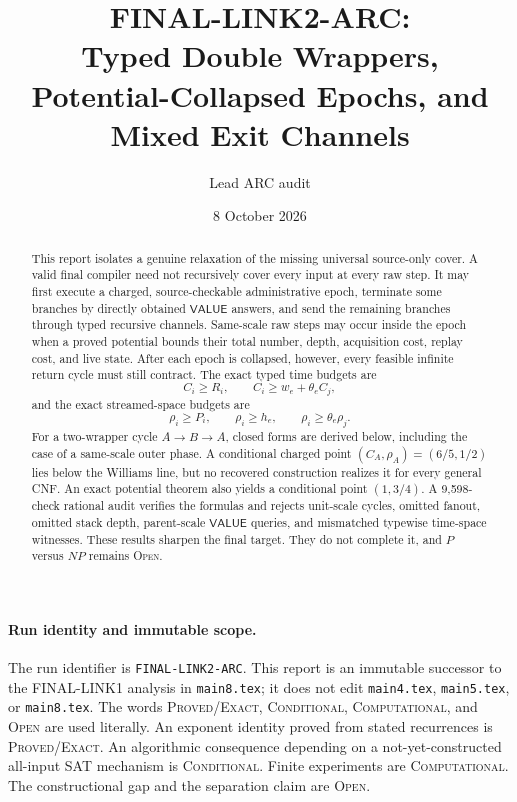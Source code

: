 \documentclass[11pt]{article}
\title{FINAL-LINK2-ARC:\\Typed Double Wrappers, Potential-Collapsed Epochs, and Mixed Exit Channels}
\author{Lead ARC audit}
\date{8 October 2026}
\newcommand{\VALUE}{\mathsf{VALUE}}
\begin{document}
\maketitle

\begin{abstract}
This report isolates a genuine relaxation of the missing universal
source-only cover.  A valid final compiler need not recursively cover every
input at every raw step.  It may first execute a charged, source-checkable
administrative epoch, terminate some branches by directly obtained
\(\VALUE\) answers, and send the remaining branches through typed recursive
channels.  Same-scale raw steps may occur inside the epoch when a proved
potential bounds their total number, depth, acquisition cost, replay cost,
and live state.  After each epoch is collapsed, however, every feasible
infinite return cycle must still contract.  The exact typed time budgets are
\[
 C_i\ge R_i,\qquad C_i\ge w_e+\theta_e C_j,
\]
and the exact streamed-space budgets are
\[
 \rho_i\ge P_i,\qquad \rho_i\ge h_e,
 \qquad \rho_i\ge\theta_e\rho_j.
\]
For a two-wrapper cycle \(A\to B\to A\), closed forms are derived below,
including the case of a same-scale outer phase.  A conditional charged point
\((C_A,\rho_A)=(6/5,1/2)\) lies below the Williams line, but no recovered
construction realizes it for every general CNF.  An exact potential theorem
also yields a conditional point \((1,3/4)\).  A 9,598-check rational audit
verifies the formulas and rejects unit-scale cycles, omitted fanout, omitted
stack depth, parent-scale \(\VALUE\) queries, and mismatched typewise
time-space witnesses.  These results sharpen the final target.  They do not
complete it, and \(P\) versus \(NP\) remains \textsc{Open}.
\end{abstract}

\paragraph{Run identity and immutable scope.}
The run identifier is \texttt{FINAL-LINK2-ARC}.  This report is an immutable
successor to the FINAL-LINK1 analysis in \texttt{main8.tex}; it does not edit
\texttt{main4.tex}, \texttt{main5.tex}, or \texttt{main8.tex}.  The words
\textsc{Proved/Exact}, \textsc{Conditional}, \textsc{Computational}, and
\textsc{Open} are used literally.  An exponent identity proved from stated
recurrences is \textsc{Proved/Exact}.  An algorithmic consequence depending
on a not-yet-constructed all-input SAT mechanism is \textsc{Conditional}.
Finite experiments are \textsc{Computational}.  The constructional gap and
the separation claim are \textsc{Open}.
\end{document}
